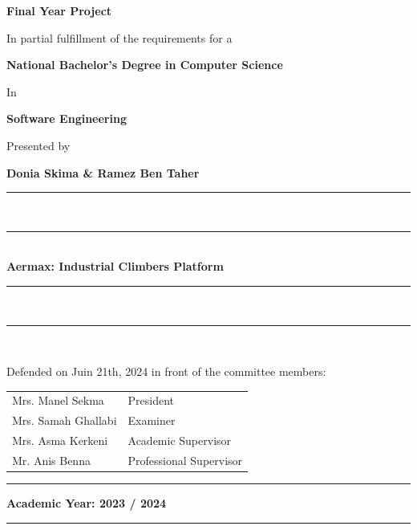 \begin{titlepage}
\begin{center}
        \vspace{2cm}

        \Huge\textbf{Final Year Project}

        \vspace{1.5cm}

        \normalsize In partial fulfillment of the requirements for a

        \Large\textbf{National Bachelor's Degree in Computer Science        }

        \normalsize In

        \Large\textbf{Software Engineering}

        \normalsize Presented by

        \large{\textbf{Donia Skima \& Ramez Ben Taher}}\\
        \vspace{0.5cm}

        \rule[5pt]{0.5\textwidth}{0.5px}\\
        \vspace{-16px}
        \rule[10pt]{0.5\textwidth}{2.5px} \\
        \LARGE{\textbf{Aermax: Industrial Climbers Platform}} \\
        \rule[5pt]{0.5\textwidth}{0.5px}\\
        \vspace{-15px}
        \rule[10pt]{0.5\textwidth}{2.5px} \\


        \vspace{1cm}

        \small Defended on Juin 21th, 2024 in front of the committee members:

        \renewcommand\arraystretch{1}
        \begin{tabular}{m{} l }
            Mrs. Manel Sekma  & President               \\
            Mrs. Samah Ghallabi  & Examiner                \\
            Mrs. Asma Kerkeni  & Academic Supervisor       \\
            Mr.  Anis Benna  & Professional Supervisor       \\
        \end{tabular}
    \end{center}
    \vfill
    \centering
    \rule[0.5px]{30px}{0.5px} \space \footnotesize \textbf{Academic Year: 2023 / 2024} \space \rule[0.5px]{30px}{0.5px}
\end{titlepage}
\cleardoublepage